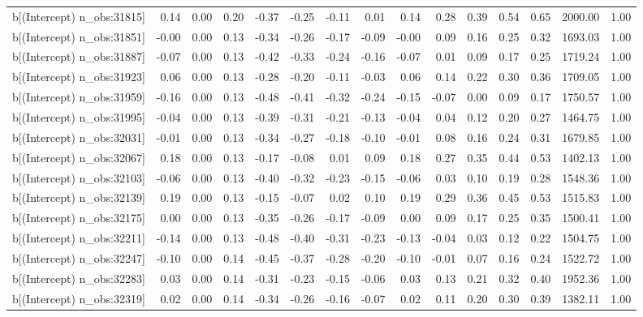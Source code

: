 \begin{table}[ht]
\begin{tabular}{rrrrrrrrrrrrrrr}
  b[(Intercept) n\_obs:31815] & 0.14 & 0.00 & 0.20 & -0.37 & -0.25 & -0.11 & 0.01 & 0.14 & 0.28 & 0.39 & 0.54 & 0.65 & 2000.00 & 1.00 \\ 
  b[(Intercept) n\_obs:31851] & -0.00 & 0.00 & 0.13 & -0.34 & -0.26 & -0.17 & -0.09 & -0.00 & 0.09 & 0.16 & 0.25 & 0.32 & 1693.03 & 1.00 \\ 
  b[(Intercept) n\_obs:31887] & -0.07 & 0.00 & 0.13 & -0.42 & -0.33 & -0.24 & -0.16 & -0.07 & 0.01 & 0.09 & 0.17 & 0.25 & 1719.24 & 1.00 \\ 
  b[(Intercept) n\_obs:31923] & 0.06 & 0.00 & 0.13 & -0.28 & -0.20 & -0.11 & -0.03 & 0.06 & 0.14 & 0.22 & 0.30 & 0.36 & 1709.05 & 1.00 \\ 
  b[(Intercept) n\_obs:31959] & -0.16 & 0.00 & 0.13 & -0.48 & -0.41 & -0.32 & -0.24 & -0.15 & -0.07 & 0.00 & 0.09 & 0.17 & 1750.57 & 1.00 \\ 
  b[(Intercept) n\_obs:31995] & -0.04 & 0.00 & 0.13 & -0.39 & -0.31 & -0.21 & -0.13 & -0.04 & 0.04 & 0.12 & 0.20 & 0.27 & 1464.75 & 1.00 \\ 
  b[(Intercept) n\_obs:32031] & -0.01 & 0.00 & 0.13 & -0.34 & -0.27 & -0.18 & -0.10 & -0.01 & 0.08 & 0.16 & 0.24 & 0.31 & 1679.85 & 1.00 \\ 
  b[(Intercept) n\_obs:32067] & 0.18 & 0.00 & 0.13 & -0.17 & -0.08 & 0.01 & 0.09 & 0.18 & 0.27 & 0.35 & 0.44 & 0.53 & 1402.13 & 1.00 \\ 
  b[(Intercept) n\_obs:32103] & -0.06 & 0.00 & 0.13 & -0.40 & -0.32 & -0.23 & -0.15 & -0.06 & 0.03 & 0.10 & 0.19 & 0.28 & 1548.36 & 1.00 \\ 
  b[(Intercept) n\_obs:32139] & 0.19 & 0.00 & 0.13 & -0.15 & -0.07 & 0.02 & 0.10 & 0.19 & 0.29 & 0.36 & 0.45 & 0.53 & 1515.83 & 1.00 \\ 
  b[(Intercept) n\_obs:32175] & 0.00 & 0.00 & 0.13 & -0.35 & -0.26 & -0.17 & -0.09 & 0.00 & 0.09 & 0.17 & 0.25 & 0.35 & 1500.41 & 1.00 \\ 
  b[(Intercept) n\_obs:32211] & -0.14 & 0.00 & 0.13 & -0.48 & -0.40 & -0.31 & -0.23 & -0.13 & -0.04 & 0.03 & 0.12 & 0.22 & 1504.75 & 1.00 \\ 
  b[(Intercept) n\_obs:32247] & -0.10 & 0.00 & 0.14 & -0.45 & -0.37 & -0.28 & -0.20 & -0.10 & -0.01 & 0.07 & 0.16 & 0.24 & 1522.72 & 1.00 \\ 
  b[(Intercept) n\_obs:32283] & 0.03 & 0.00 & 0.14 & -0.31 & -0.23 & -0.15 & -0.06 & 0.03 & 0.13 & 0.21 & 0.32 & 0.40 & 1952.36 & 1.00 \\ 
  b[(Intercept) n\_obs:32319] & 0.02 & 0.00 & 0.14 & -0.34 & -0.26 & -0.16 & -0.07 & 0.02 & 0.11 & 0.20 & 0.30 & 0.39 & 1382.11 & 1.00 \\ 

\end{tabular}
\end{table}
